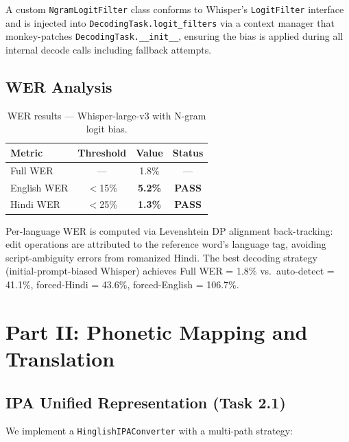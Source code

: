 \documentclass[11pt]{article}
\begin{document}
A custom \texttt{NgramLogitFilter} class conforms to Whisper's
\texttt{LogitFilter} interface and is injected into
\texttt{DecodingTask.logit\_filters} via a context manager that
monkey-patches \texttt{DecodingTask.\_\_init\_\_}, ensuring the bias is
applied during all internal decode calls including fallback attempts.

\subsection{WER Analysis}

\begin{table}[h]
\centering
\vspace{4pt}
\caption{WER results --- Whisper-large-v3 with N-gram logit bias.}
\label{tab:wer}
\small
\begin{tabular}{lccc}
\toprule
\textbf{Metric} & \textbf{Threshold} & \textbf{Value} & \textbf{Status}\\
\midrule
Full WER       & ---    & 1.8\%  & ---\\
English WER    & $<$15\% & \textbf{5.2\%}  & \textcolor{passgreen}{\textbf{PASS}}\\
Hindi WER      & $<$25\% & \textbf{1.3\%}  & \textcolor{passgreen}{\textbf{PASS}}\\
\bottomrule
\end{tabular}
\end{table}

Per-language WER is computed via Levenshtein DP alignment back-tracking:
edit operations are attributed to the reference word's language tag, avoiding
script-ambiguity errors from romanized Hindi. The best decoding strategy
(initial-prompt-biased Whisper) achieves Full WER = 1.8\% vs.\
auto-detect = 41.1\%, forced-Hindi = 43.6\%, forced-English = 106.7\%.

\section{Part II: Phonetic Mapping and Translation}

\subsection{IPA Unified Representation (Task 2.1)}

We implement a \texttt{HinglishIPAConverter} with a multi-path strategy:
\end{document}
